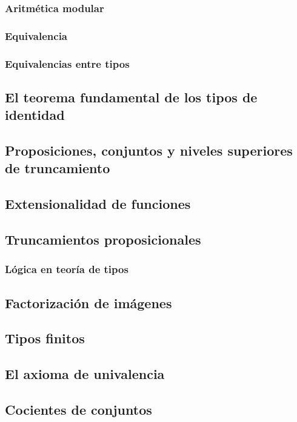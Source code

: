 \documentclass{article}
\begin{document}
\subsubsection{Aritmética modular}

\subsubsection{Equivalencia}
    \subsubsection{Equivalencias entre tipos}
\subsection{El teorema fundamental de los tipos de identidad}
\subsection{Proposiciones, conjuntos y niveles superiores de truncamiento}
\subsection{Extensionalidad de funciones}
\subsection{Truncamientos proposicionales}
\subsubsection{Lógica en teoría de tipos}
\subsection{Factorización de imágenes}
\subsection{Tipos finitos}
\subsection{El axioma de univalencia}
\subsection{Cocientes de conjuntos}



\end{document}
